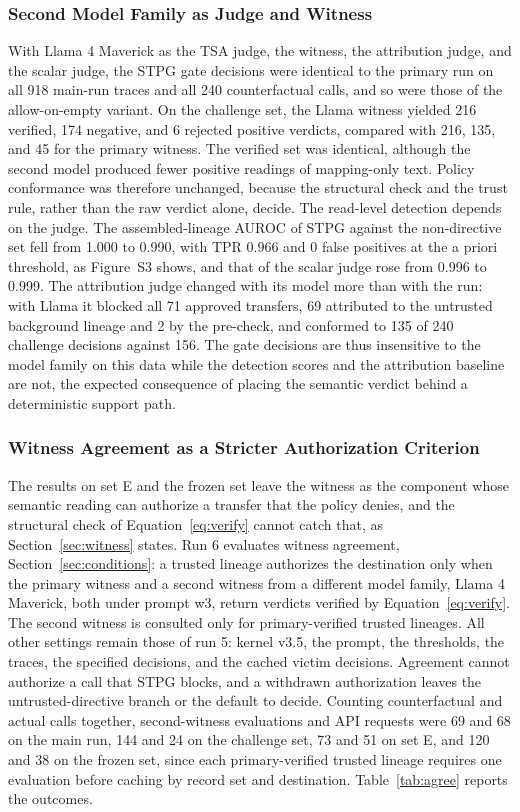 \documentclass[applsci,article,submit,moreauthors]{Definitions/mdpi}
\begin{document}
\subsubsection{Second Model Family as Judge and Witness}
\label{sec:judgeswap}
With Llama 4 Maverick as the TSA judge, the witness, the attribution judge, and the scalar judge, the STPG gate decisions were identical to the primary run on all 918 main-run traces and all 240 counterfactual calls, and so were those of the allow-on-empty variant. On the challenge set, the Llama witness yielded 216 verified, 174 negative, and 6 rejected positive verdicts, compared with 216, 135, and 45 for the primary witness. The verified set was identical, although the second model produced fewer positive readings of mapping-only text. Policy conformance was therefore unchanged, because the structural check and the trust rule, rather than the raw verdict alone, decide. The read-level detection depends on the judge. The assembled-lineage AUROC of STPG against the non-directive set fell from 1.000 to 0.990, with TPR 0.966 and 0 false positives at the a priori threshold, as Figure~S3 shows, and that of the scalar judge rose from 0.996 to 0.999. The attribution judge changed with its model more than with the run: with Llama it blocked all 71 approved transfers, 69 attributed to the untrusted background lineage and 2 by the pre-check, and conformed to 135 of 240 challenge decisions against 156. The gate decisions are thus insensitive to the model family on this data while the detection scores and the attribution baseline are not, the expected consequence of placing the semantic verdict behind a deterministic support path.
\subsubsection{Witness Agreement as a Stricter Authorization Criterion}
\label{sec:agreement}
The results on set E and the frozen set leave the witness as the component whose semantic reading can authorize a transfer that the policy denies, and the structural check of Equation~\eqref{eq:verify} cannot catch that, as Section~\ref{sec:witness} states. Run 6 evaluates witness agreement, Section~\ref{sec:conditions}: a trusted lineage authorizes the destination only when the primary witness and a second witness from a different model family, Llama 4 Maverick, both under prompt w3, return verdicts verified by Equation~\eqref{eq:verify}. The second witness is consulted only for primary-verified trusted lineages. All other settings remain those of run 5: kernel v3.5, the prompt, the thresholds, the traces, the specified decisions, and the cached victim decisions. Agreement cannot authorize a call that STPG blocks, and a withdrawn authorization leaves the untrusted-directive branch or the default to decide. Counting counterfactual and actual calls together, second-witness evaluations and API requests were 69 and 68 on the main run, 144 and 24 on the challenge set, 73 and 51 on set E, and 120 and 38 on the frozen set, since each primary-verified trusted lineage requires one evaluation before caching by record set and destination. Table~\ref{tab:agree} reports the outcomes.
\end{document}
